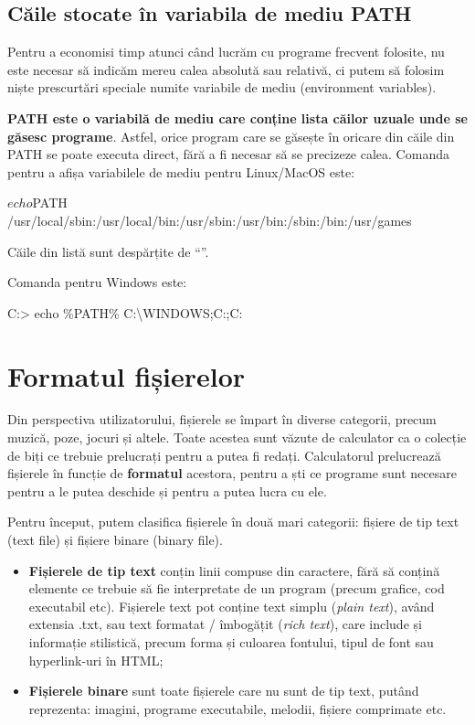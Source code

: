 \subsection{Căile stocate în variabila de mediu PATH}
\label{sec:file-system-path}

Pentru a economisi timp atunci când lucrăm cu programe frecvent folosite, nu
este necesar să indicăm mereu calea absolută sau relativă, ci putem să folosim
niște prescurtări speciale numite variabile de mediu (environment variables).

\textbf{PATH este o variabilă de mediu care conține lista căilor uzuale unde se
găsesc programe}.  Astfel, orice program care se găsește în oricare din căile
din PATH se poate executa direct, fără a fi necesar să se precizeze calea.
Comanda pentru a afișa variabilele de mediu pentru Linux/MacOS este:

\begin{screen}
$ echo $PATH
/usr/local/sbin:/usr/local/bin:/usr/sbin:/usr/bin:/sbin:/bin:/usr/games
\end{screen}

Căile din listă sunt despărțite de “\file{:}”.

Comanda pentru Windows este:

\begin{screen}
C:> echo \%PATH\%
C:\textbackslash{}WINDOWS;C:\WINDOWS;C:\WINDOWS{}\Wbem
\end{screen}

\section{Formatul fișierelor}
\label{sec:file-system-format}

Din perspectiva utilizatorului, fișierele se împart în diverse categorii, precum
muzică, poze, jocuri și altele. Toate acestea sunt văzute de calculator ca o
colecție de biți ce trebuie prelucrați pentru a putea fi redați. Calculatorul
prelucrează fișierele în funcție de \textbf{formatul} acestora, pentru a ști ce
programe sunt necesare pentru a le putea deschide și pentru a putea lucra cu
ele.

Pentru început, putem clasifica fișierele în două mari categorii: fișiere de tip
text (text file) și fișiere binare (binary file).

\begin{itemize}
	\item \textbf{Fișierele de tip text} conțin linii compuse din caractere,
		fără să conțină elemente ce trebuie să fie interpretate de un
		program (precum grafice, cod executabil etc).  Fișierele text
		pot conține text simplu (\textit{plain text}), având extensia
		.txt, sau text formatat / îmbogățit (\textit{rich text}), care
		include și informație stilistică, precum forma și culoarea
		fontului, tipul de font sau hyperlink-uri în HTML;
	\item \textbf{Fișierele binare} sunt toate fișierele care nu sunt de tip
		text, putând reprezenta: imagini, programe executabile, melodii,
		fișiere comprimate etc.
\end{itemize}

